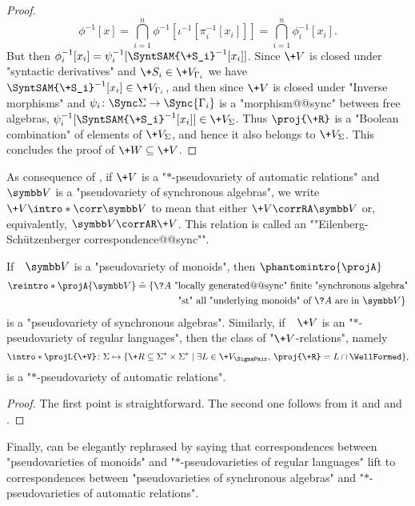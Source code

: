 \begin{proof}
	\[
		\phi^{-1}[x] = \bigcap_{i=1}^n \phi^{-1}[\iota^{-1}[\pi_i^{-1}[x_i]]]
		= \bigcap_{i=1}^n \phi_i^{-1}[x_i].
	\]
	But then $\phi_i^{-1}[x_i] = \psi_i^{-1}[\SyntSAM{\+S_i}^{-1}[x_i]]$.
	Since $\+V$ is closed under "syntactic derivatives" and $\+S_i \in \+V_{\Gamma_i}$
	we have $\SyntSAM{\+S_i}^{-1}[x_i] \in \+V_{\Gamma_i}$, and then since $\+V$ is closed under
	"Inverse morphisms" and $\psi_i\colon \Sync\Sigma \to \Sync{\Gamma_i}$ is a "morphism@@sync" between free algebras,
	$\psi_i^{-1}[\SyntSAM{\+S_i}^{-1}[x_i]] \in \+V_{\Sigma}$.
	Thus $\proj{\+R}$ is a "Boolean combination" of elements of $\+V_{\Sigma}$, and hence
	it also belongs to $\+V_{\Sigma}$. This concludes the proof of $\+W \subseteq \+V$.
\end{proof}

As consequence of , if
$\+V$ is a "$\ast$-pseudovariety of automatic relations"
and $\B{V}$ is a "pseudovariety of synchronous algebras",
we write \AP$\+V \intro*\corr \B{V}$
to mean that either $\+V \corrRA \B{V}$ or, equivalently, $\B{V} \corrAR \+V$.
This relation is called an \AP""Eilenberg-Schützenberger correspondence@@sync"".

\begin{proposition}
	If~~$\B{V}$ is a "pseudovariety of monoids", then \AP$\phantomintro{\projA}$
	\begin{align*}
		\reintro*\projA{\B{V}} & \defeq
		\{\?A \text{ "locally generated@@sync" finite "synchronous algebra"} \\
		& \qquad\qquad \text{ "st" all "underlying monoids" of $\?A$ are in $\B{V}$}\}
	\end{align*}
	is a "pseudovariety of synchronous algebras". Similarly,
	if~~$\+V$ is an "$\ast$-pseudovariety of regular languages", then
	the class of "$\+V$-relations", namely
	\[
		\intro*\projL{\+V} \colon
		\Sigma \mapsto \{\+R \subseteq \Sigma^* \times \Sigma^* \mid \exists L \in \+V_{\SigmaPair},\, \proj{\+R} = L \cap \WellFormed \},
	\]
	is a "$\ast$-pseudovariety of automatic relations".
\end{proposition}

\begin{proof}
	The first point is straightforward. The second one follows from it and and .
\end{proof}

\AP{}
Finally,  can be elegantly rephrased
by saying that correspondences between "pseudovarieties of monoids"
and "$\ast$-pseudovarieties of regular languages" lift to correspondences
between "pseudovarieties of synchronous algebras" and
"$\ast$-pseudovarieties of automatic relations".

